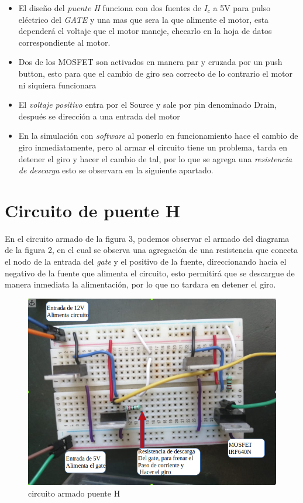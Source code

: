 \documentclass[11pt,a4paper]{article}
\begin{document}
\newpage

\begin{itemize}

\item El diseño del \emph{puente H} funciona con dos fuentes de $I_c$ a 5V para pulso eléctrico del \emph{GATE} y una mas que sera la que alimente el motor, esta dependerá el voltaje que el motor maneje, checarlo en la hoja de datos correspondiente al motor.

\item Dos de los MOSFET son activados en manera par y cruzada por un push button, esto para que el cambio de giro sea correcto de lo contrario el motor ni siquiera funcionara

\item El \emph{voltaje positivo} entra por el Source y sale por pin denominado Drain, después se dirección a una entrada del motor

\item En la simulación con \emph{software} al ponerlo en funcionamiento hace el cambio de giro inmediatamente, pero al armar el circuito tiene un problema, tarda en detener el giro y hacer el cambio de tal, por lo que se agrega una \emph{resistencia de descarga} esto se observara en la siguiente apartado.

\end{itemize}

\section{Circuito de puente H}
En el circuito armado de la figura 3, podemos observar el armado del diagrama de la figura 2, en el cual se observa una agregación de una resistencia que conecta el nodo de la entrada del \emph{gate} y el positivo de la fuente, direccionando hacia el negativo de la fuente que alimenta el circuito, esto permitirá que se descargue de manera inmediata la alimentación, por lo que no tardara en detener el giro.\cite{munoz2016ensenando}


\begin{figure}[h]
\begin{center}
\includegraphics[scale=0.4]{4.png}
\caption{circuito armado puente H}
\end{center}
\end{figure}
\end{document}
